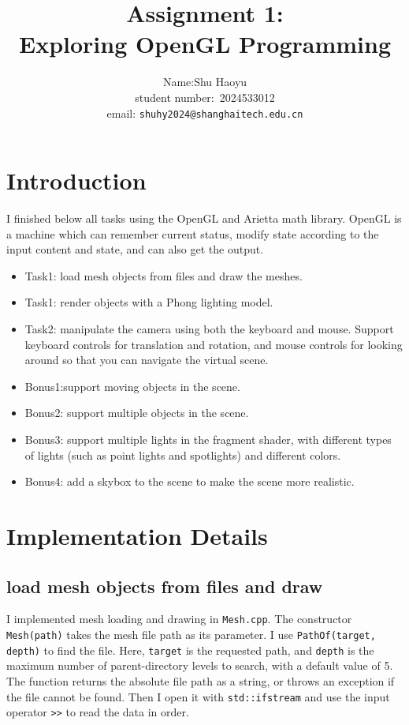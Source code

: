 \documentclass[acmtog]{acmart}
\title{Assignment 1:\\ {Exploring OpenGL Programming}}
\author{Name:\quad Shu Haoyu \\ student number:\ 2024533012
\\email: \quad \texttt{shuhy2024@shanghaitech.edu.cn}}
\begin{document}
\maketitle

\vspace*{2 ex}

\section{Introduction}
I finished below all tasks using the OpenGL and Arietta math library.
OpenGL is a machine which can remember current status,
modify state according to the input content and state, and can also get the output.

\begin{itemize}
\item Task1:  load mesh objects from files and draw the meshes. 
\item Task1: render objects with a Phong lighting model. 
\item Task2: manipulate the camera using both the keyboard and mouse. Support keyboard controls for translation and rotation, and mouse controls for looking around so that you can navigate the virtual scene.
\item Bonus1:support moving objects in the scene. 
\item Bonus2: support multiple objects in the scene.
\item Bonus3:  support multiple lights in the fragment shader, with different types of lights (such as point lights and spotlights) and different colors. 
\item Bonus4: add a skybox to the scene to make the scene more realistic. 

\end{itemize}
\section{Implementation Details}
\subsection{load mesh objects from files and draw}
I implemented mesh loading and drawing in \texttt{Mesh.cpp}. The constructor \texttt{Mesh(path)} takes the mesh file path as its parameter. I use \texttt{PathOf(target, depth)} to find the file. Here, \texttt{target} is the requested path, and \texttt{depth} is the maximum number of parent-directory levels to search, with a default value of 5. The function returns the absolute file path as a string, or throws an exception if the file cannot be found. Then I open it with \texttt{std::ifstream} and use the input operator \texttt{>{}>} to read the data in order.
\end{document}
